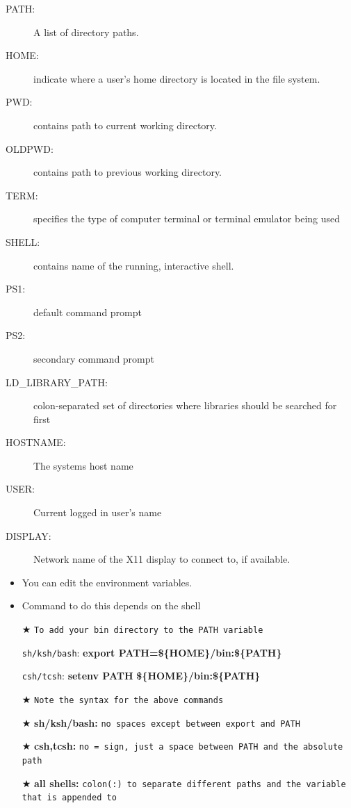 \documentclass[slidestop,mathserif,compress,xcolor=svgnames]{beamer}
\begin{document}
\begin{frame}
\begin{itemize}
  \end{itemize}
  \framebreak
  \begin{description}
    \item[PATH:] A list of directory paths.
    \item[HOME:] indicate where a user's home directory is located in the file system.
    \item[PWD:] contains path to current working directory.
    \item[OLDPWD:] contains path to previous working directory.
    \item[TERM:] specifies the type of computer terminal or terminal emulator being used
    \item[SHELL:] contains name of the running, interactive shell.
    \item[PS1:] default command prompt
    \item[PS2:] secondary command prompt
    \item[LD\_LIBRARY\_PATH:] colon-separated set of directories where libraries should be searched for first
    \item[HOSTNAME:] The systems host name
    \item[USER:] Current logged in user's name
    \item[DISPLAY:] Network name of the X11 display to connect to, if available.
  \end{description}
  \framebreak
  \begin{itemize}
    \item You can edit the environment variables.
    \item Command to do this depends on the shell
    \item[$\bigstar$] \texttt{To add your bin directory to the PATH variable}
    \item[] \texttt{sh/ksh/bash}: \textbf{export PATH=\$\{HOME\}/bin:\$\{PATH\}}
    \item[] \texttt{csh/tcsh}: \textbf{setenv PATH\,\,\$\{HOME\}/bin:\$\{PATH\}}
    \item[$\bigstar$] \texttt{Note the syntax for the above commands}
    \item[$\bigstar$] \textbf{sh/ksh/bash:} \texttt{no spaces except between export and PATH}
    \item[$\bigstar$] \textbf{csh,tcsh:} \texttt{no = sign, just a space between PATH and the absolute path}
    \item[$\bigstar$] \textbf{all shells:} \texttt{colon(:) to separate different paths and the variable that is appended to}

\end{itemize}
\end{frame}
\end{document}
